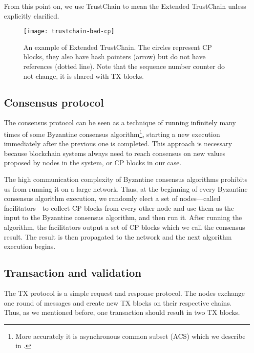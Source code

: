 From this point on, we use TrustChain to mean the Extended TrustChain unless explicitly clarified.

\begin{figure}
    \texttt{[image: trustchain-bad-cp]}
    \centering
    \caption{
    An example of Extended TrustChain.
    The circles represent CP blocks,
    they also have hash pointers (arrow) but do not have references (dotted line).
    Note that the sequence number counter do not change, it is shared with TX blocks.}
    \label{fig:trustchain-bad-cp}
\end{figure}

\subsection*{Consensus protocol}

The consensus protocol can be seen as a technique of running infinitely many times of some 
Byzantine consensus algorithm\footnote{More accurately it is asynchronous common subset (ACS) which we describe in .},
starting a new execution immediately after the previous one is completed.
This approach is necessary because blockchain systems always need to reach consensus on new values proposed by nodes in the system,
or CP blocks in our case.

The high communication complexity of Byzantine consensus algorithms prohibits us from running it on a large network.
Thus, at the beginning of every Byzantine consensus algorithm execution,
we randomly elect a set of nodes---called facilitators---to collect CP blocks from every other node and use them as the input to the Byzantine consensus algorithm, and then run it.
After running the algorithm,
the facilitators output a set of CP blocks which we call the consensus result.
The result is then propagated to the network and the next algorithm execution begins.

\subsection*{Transaction and validation}
The TX protocol is a simple request and response protocol.
The nodes exchange one round of messages and create new TX blocks on their respective chains.
Thus, as we mentioned before, one transaction should result in two TX blocks.

